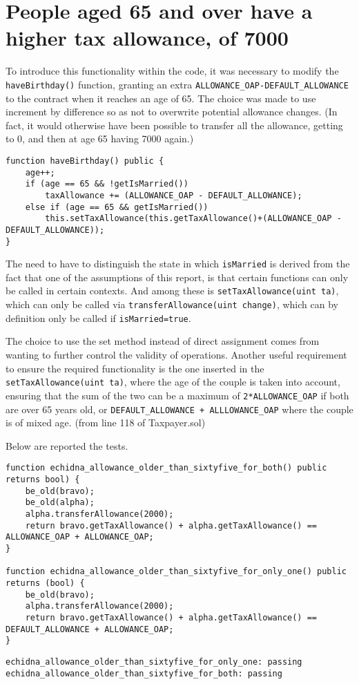 \documentclass{article}
\begin{document}
\section{People aged 65 and over have a higher tax allowance, of 7000}
To introduce this functionality within the code, it was necessary to modify the \texttt{haveBirthday()} function, granting an extra \texttt{ALLOWANCE\_OAP-DEFAULT\_ALLOWANCE} to the contract when it reaches an age of 65.
The choice was made to use increment by difference so as not to overwrite potential allowance changes. (In fact, it would otherwise have been possible to transfer all the allowance, getting to 0, and then at age 65 having 7000 again.)
\begin{verbatim}
function haveBirthday() public {
    age++;
    if (age == 65 && !getIsMarried()) 
        taxAllowance += (ALLOWANCE_OAP - DEFAULT_ALLOWANCE);
    else if (age == 65 && getIsMarried()) 
        this.setTaxAllowance(this.getTaxAllowance()+(ALLOWANCE_OAP - DEFAULT_ALLOWANCE));
}
\end{verbatim} 
The need to have to distinguish the state in which \texttt{isMarried} is derived from the fact that one of the assumptions of this report, is that certain functions can only be called in certain contexts. And among these is \texttt{setTaxAllowance(uint ta)}, which can only be called via \texttt{transferAllowance(uint change)}, which can by definition only be called if \texttt{isMarried=true}.

The choice to use the set method instead of direct assignment comes from wanting to further control the validity of operations.
Another useful requirement to ensure the required functionality is the one inserted in the \texttt{setTaxAllowance(uint ta)}, where the age of the couple is taken into account, ensuring that the sum of the two can be a maximum of \texttt{2*ALLOWANCE\_OAP} if both are over 65 years old, or \texttt{DEFAULT\_ALLOWANCE + ALLLOWANCE\_OAP} where the couple is of mixed age. (from line 118 of Taxpayer.sol)

Below are reported the tests.
\begin{verbatim}
function echidna_allowance_older_than_sixtyfive_for_both() public returns bool) {
    be_old(bravo);
    be_old(alpha);
    alpha.transferAllowance(2000);
    return bravo.getTaxAllowance() + alpha.getTaxAllowance() == ALLOWANCE_OAP + ALLOWANCE_OAP;
}

function echidna_allowance_older_than_sixtyfive_for_only_one() public returns (bool) {
    be_old(bravo);
    alpha.transferAllowance(2000);
    return bravo.getTaxAllowance() + alpha.getTaxAllowance() == DEFAULT_ALLOWANCE + ALLOWANCE_OAP;
}
\end{verbatim} 
\begin{verbatim}
echidna_allowance_older_than_sixtyfive_for_only_one: passing
echidna_allowance_older_than_sixtyfive_for_both: passing
\end{verbatim}
\end{document}
